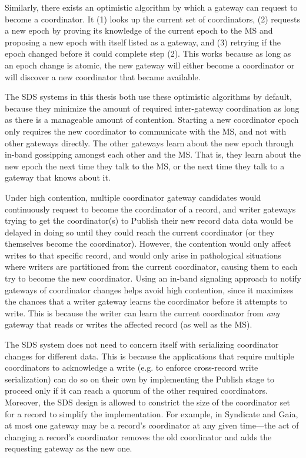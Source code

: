 Similarly, there exists an optimistic algorithm by which a gateway can request
to become a coordinator.  It (1) looks up the current set of coordinators, (2)
requests a new epoch by proving its knowledge of the current epoch to the MS
and proposing a new epoch with itself listed as a gateway, and (3) retrying if the epoch
changed before it could complete step (2).  This works because as long as an epoch change
is atomic, the new gateway will either become a coordinator or will discover a
new coordinator that became available.

The SDS systems in this thesis both use these optimistic algorithms by
default, because they minimize the amount of required inter-gateway coordination
as long as there is a manageable amount of contention.
Starting a new coordinator epoch only requires the new coordinator to communicate with the MS, and not with
other gateways directly.  The other gateways learn about the new epoch through
in-band gossipping amongst each
other and the MS.  That is, they learn about the new epoch the next time they talk to
the MS, or the next time they talk to a gateway that knows about it.

Under high contention, multiple coordinator gateway candidates would continuously request
to become the coordinator of a record, and writer gateways trying to get the
coordinator(s) to Publish their new record data
data would be delayed in doing so until they could reach the current coordinator (or they
themselves become the coordinator).  However, the contention would only affect
writes to that specific record, and would only arise in pathological situations
where writers are partitioned from the current coordinator, causing
them to each try to become the new coordinator.
Using an in-band signaling approach to notify gateways of
coordinator changes helps avoid high contention, since it maximizes
the chances that a writer gateway learns the coordinator before it attempts to
write.  This is because the writer can learn the current coordinator 
from \emph{any} gateway that reads or writes the affected record (as well as the
MS).

The SDS system does not need to concern itself with serializing coordinator
changes for different data.  This is because the applications that require
multiple coordinators to acknowledge a write (e.g. to enforce cross-record write
serialization) can do so on their own by implementing the
Publish stage to proceed only if it can reach a quorum of the other required
coordinators.  Moreover, the SDS design is allowed to constrict the size
of the coordinator set for a record to simplify the implementation.
For example, in Syndicate and Gaia, at most one gateway may be a record's coordinator
at any given time---the act of changing a record's coordinator removes the old
coordinator and adds the requesting gateway as the new one.

